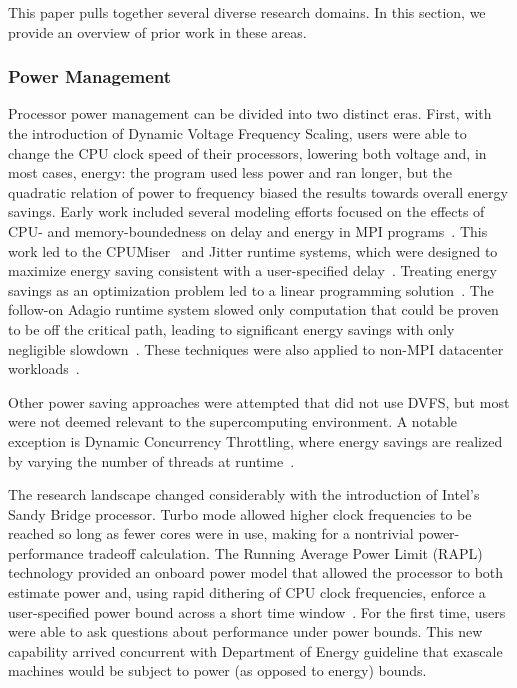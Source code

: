 This paper pulls together several diverse research domains. In this section,
we provide an overview of prior work in these areas.

\subsubsection{Power Management}
Processor power management can be divided into two distinct eras. First, with 
the introduction of Dynamic Voltage Frequency Scaling, users were able to 
change the CPU clock speed of their processors, lowering both voltage and,
in most cases, energy: the program used less power and ran longer, but the
quadratic relation of power to frequency biased the results towards overall
energy savings. Early work included several modeling efforts focused on
the effects of CPU- and memory-boundedness on delay and energy in MPI programs~\cite{SpringerPPoPP2006,GeICPP2007,LiHPCA2006,CameronSC2005,HsuSC2005}. 
This work led to the CPUMiser~\cite{GeICPP2007} and Jitter runtime systems, which were designed 
to maximize energy saving consistent with a user-specified delay~\cite{KappiahSC2005}.
Treating energy savings as an optimization problem led to a linear programming
solution~\cite{rountree:07}. The follow-on Adagio runtime system slowed only
computation that could be proven to be off the critical path, leading to significant
energy savings with only negligible slowdown~\cite{rountree:09}. These 
techniques were also applied to non-MPI datacenter workloads~\cite{femal:04}. 

Other power saving approaches were attempted that did not use DVFS, but most
were not deemed relevant to the supercomputing environment. A notable exception
is Dynamic Concurrency Throttling, where energy savings are realized by varying
the number of threads at runtime~\cite{Curtis1,Curtis2,Curtis3}.

The research landscape changed considerably with the introduction of Intel's
Sandy Bridge processor. Turbo mode allowed higher clock frequencies to be
reached so long as fewer cores were in use, making for a nontrivial power- performance tradeoff
calculation. The Running Average Power Limit (RAPL) technology provided an onboard power model that allowed the processor to both
estimate power and, using rapid dithering of CPU clock frequencies, enforce a
user-specified power bound across a short time window~\cite{IntelSDM,David2010}. 
For the first time, users were able to ask questions about performance under 
power bounds. This new capability arrived concurrent with Department of Energy
guideline that exascale machines would be subject to power (as opposed to energy) bounds.


